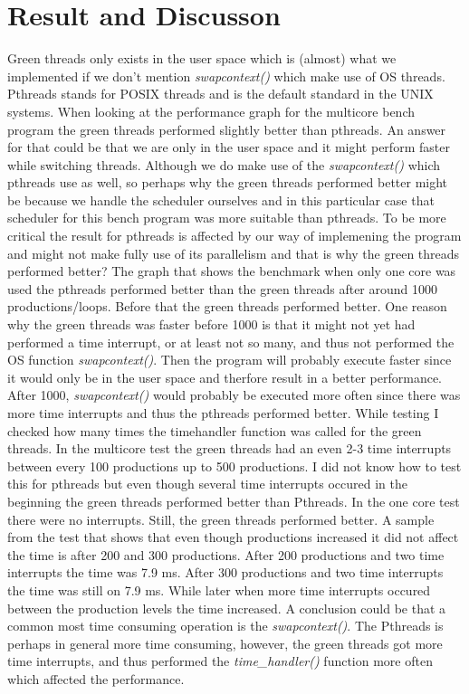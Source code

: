 \documentclass[12pt, letterpaper]{article}
\begin{document}
\section{Result and Discusson}
Green threads only exists in the user space which is (almost) what we implemented if we don't mention \emph{swapcontext()} which
make use of OS threads. Pthreads stands for POSIX threads and is the default standard in the UNIX systems. 
When looking at the performance graph for the multicore bench program the green threads performed slightly better
than pthreads. An answer for that could be that we are only in the user space and it might perform faster while switching threads.
Although we do make use of the \emph{swapcontext()} which pthreads use as well, so perhaps why the green threads performed better might be because
we handle the scheduler ourselves and in this particular case that scheduler for this bench program was more suitable than pthreads.
To be more critical the result for pthreads is affected by our way of implemening the program and might not make fully use of its parallelism and that is why 
the green threads performed better? The graph that shows the benchmark when only one core was used the pthreads performed better than the green threads after 
around 1000 productions/loops. Before that the green threads performed better. One reason why the green threads was faster before 1000 is that it might not yet had performed
a time interrupt, or at least not so many, and thus not performed the OS function \emph{swapcontext()}. Then the program will probably execute faster since it 
would only be in the user space and therfore result in a better performance. After 1000, \emph{swapcontext()} would probably be executed more often since there was more
time interrupts and thus the pthreads performed better. While testing I checked how many times the timehandler function was called for the green threads. In the multicore test 
the green threads had an even 2-3 time interrupts between every 100 productions up to 500 productions. I did not know how to test this for pthreads but even though several time 
interrupts occured in the beginning the green threads performed better than Pthreads. In the one core test there were no interrupts. Still, the green threads performed better. 
A sample from the test that shows that even though productions increased it did not affect the time is after 200 and 300 productions. After 200 productions and two time 
interrupts the time was 7.9 ms. After 300 productions and two time interrupts the time was still on 7.9 ms. While later when more time interrupts occured between the production 
levels the time increased. A conclusion could be that a common most time consuming operation is the \emph{swapcontext()}. The Pthreads is perhaps in general more time consuming, 
however, the green threads got more time interrupts, and thus performed the \emph{time{\_}handler()} function more often which affected the performance. 
\end{document}
